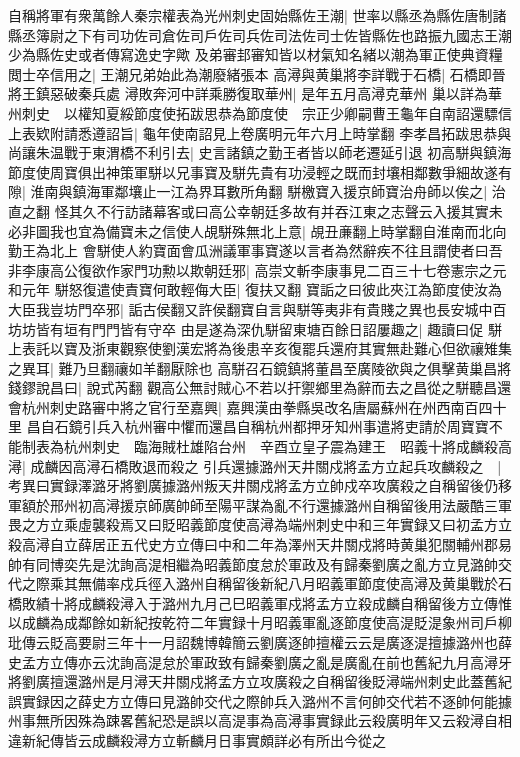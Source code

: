 自稱將軍有衆萬餘人秦宗權表為光州刺史固始縣佐王潮|{
	世率以縣丞為縣佐唐制諸縣丞簿尉之下有司功佐司倉佐司戶佐司兵佐司法佐司士佐皆縣佐也路振九國志王潮少為縣佐史或者傳寫逸史字歟}
及弟審邽審知皆以材氣知名緒以潮為軍正使典資糧閲士卒信用之|{
	王潮兄弟始此為潮廢緒張本}
高潯與黄巢將李詳戰于石橋|{
	石橋即晉將王鎮惡破秦兵處}
潯敗奔河中詳乘勝復取華州|{
	是年五月高潯克華州}
巢以詳為華州刺史　以權知夏綏節度使拓跋思恭為節度使　宗正少卿嗣曹王龜年自南詔還驃信上表欵附請悉遵詔旨|{
	龜年使南詔見上卷廣明元年六月上時掌翻}
李孝昌拓跋思恭與尚讓朱温戰于東渭橋不利引去|{
	史言諸鎮之勤王者皆以師老遷延引退}
初高駢與鎮海節度使周寶俱出神策軍駢以兄事寶及駢先貴有功浸輕之既而封壤相鄰數爭細故遂有隙|{
	淮南與鎮海軍鄰壤止一江為界耳數所角翻}
駢檄寶入援京師寶治舟師以俟之|{
	治直之翻}
怪其久不行訪諸幕客或曰高公幸朝廷多故有并吞江東之志聲云入援其實未必非圖我也宜為備寶未之信使人覘駢殊無北上意|{
	覘丑亷翻上時掌翻自淮南而北向勤王為北上}
會駢使人約寶面會瓜洲議軍事寶遂以言者為然辭疾不往且謂使者曰吾非李康高公復欲作家門功勲以欺朝廷邪|{
	高崇文斬李康事見二百三十七卷憲宗之元和元年}
駢怒復遣使責寶何敢輕侮大臣|{
	復扶又翻}
寶詬之曰彼此夾江為節度使汝為大臣我豈坊門卒邪|{
	詬古侯翻又許侯翻寶自言與駢等夷非有貴賤之異也長安城中百坊坊皆有垣有門門皆有守卒}
由是遂為深仇駢留東塘百餘日詔屢趣之|{
	趣讀曰促}
駢上表託以寶及浙東觀察使劉漢宏將為後患辛亥復罷兵還府其實無赴難心但欲禳雉集之異耳|{
	難乃旦翻禳如羊翻厭除也}
高駢召石鏡鎮將董昌至廣陵欲與之俱擊黄巢昌將錢鏐說昌曰|{
	說式芮翻}
觀高公無討賊心不若以扞禦鄉里為辭而去之昌從之駢聽昌還會杭州刺史路審中將之官行至嘉興|{
	嘉興漢由拳縣吳改名唐屬蘇州在州西南百四十里}
昌自石鏡引兵入杭州審中懼而還昌自稱杭州都押牙知州事遣將吏請於周寶寶不能制表為杭州刺史　臨海賊杜雄陷台州　辛酉立皇子震為建王　昭義十將成麟殺高潯|{
	成麟因高潯石橋敗退而殺之}
引兵還據潞州天井關戍將孟方立起兵攻麟殺之　|{
	考異曰實録澤潞牙將劉廣據潞州叛天井關戍將孟方立帥戍卒攻廣殺之自稱留後仍移軍額於邢州初高潯援京師廣帥師至陽平謀為亂不行還據潞州自稱留後用法嚴酷三軍畏之方立乘虛襲殺焉又曰貶昭義節度使高潯為端州刺史中和三年實録又曰初孟方立殺高潯自立薛居正五代史方立傳曰中和二年為澤州天井關戍將時黄巢犯關輔州郡易帥有同博奕先是沈詢高湜相繼為昭義節度怠於軍政及有歸秦劉廣之亂方立見潞帥交代之際乘其無備率戍兵徑入潞州自稱留後新紀八月昭義軍節度使高潯及黄巢戰於石橋敗績十將成麟殺潯入于潞州九月己巳昭義軍戍將孟方立殺成麟自稱留後方立傳惟以成麟為成鄰餘如新紀按乾符二年實録十月昭義軍亂逐節度使高湜貶湜象州司戶柳玭傳云貶高要尉三年十一月詔魏博韓簡云劉廣逐帥擅權云云是廣逐湜擅據潞州也薛史孟方立傳亦云沈詢高湜怠於軍政致有歸秦劉廣之亂是廣亂在前也舊紀九月高潯牙將劉廣擅還潞州是月潯天井關戍將孟方立攻廣殺之自稱留後貶潯端州刺史此蓋舊紀誤實録因之薛史方立傳曰見潞帥交代之際帥兵入潞州不言何帥交代若不逐帥何能據州事無所因殊為踈畧舊紀恐是誤以高湜事為高潯事實録此云殺廣明年又云殺潯自相違新紀傳皆云成麟殺潯方立斬麟月日事實頗詳必有所出今從之}
